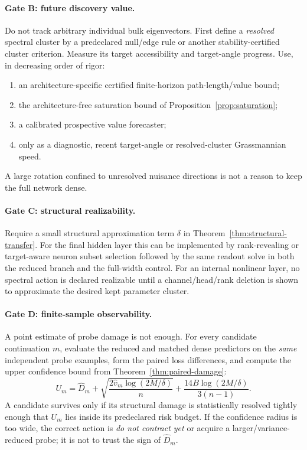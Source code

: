 \paragraph{Gate B: future discovery value.}
Do not track arbitrary individual bulk eigenvectors. First define a \emph{resolved} spectral cluster by a predeclared null/edge rule or another stability-certified cluster criterion. Measure its target accessibility and target-angle progress. Use, in decreasing order of rigor:
\begin{enumerate}[label=(\alph*)]
\item an architecture-specific certified finite-horizon path-length/value bound;
\item the architecture-free saturation bound of Proposition~\ref{prop:saturation};
\item a calibrated prospective value forecaster;
\item only as a diagnostic, recent target-angle or resolved-cluster Grassmannian speed.
\end{enumerate}
A large rotation confined to unresolved nuisance directions is not a reason to keep the full network dense.

\paragraph{Gate C: structural realizability.}
Require a small structural approximation term $\delta$ in Theorem~\ref{thm:structural-transfer}. For the final hidden layer this can be implemented by rank-revealing or target-aware neuron subset selection followed by the same readout solve in both the reduced branch and the full-width control. For an internal nonlinear layer, no spectral action is declared realizable until a channel/head/rank deletion is shown to approximate the desired kept parameter cluster.

\paragraph{Gate D: finite-sample observability.}
A point estimate of probe damage is not enough. For every candidate continuation $m$, evaluate the reduced and matched dense predictors on the \emph{same} independent probe examples, form the paired loss differences, and compute the upper confidence bound from Theorem~\ref{thm:paired-damage}:
\[
U_m
=
\widehat D_m
+
\sqrt{\frac{2\widehat v_m\log(2M/\delta)}{n}}
+
\frac{14B\log(2M/\delta)}{3(n-1)}.
\]
A candidate survives only if its structural damage is statistically resolved tightly enough that $U_m$ lies inside its predeclared risk budget. If the confidence radius is too wide, the correct action is \emph{do not contract yet} or acquire a larger/variance-reduced probe; it is not to trust the sign of $\widehat D_m$.

